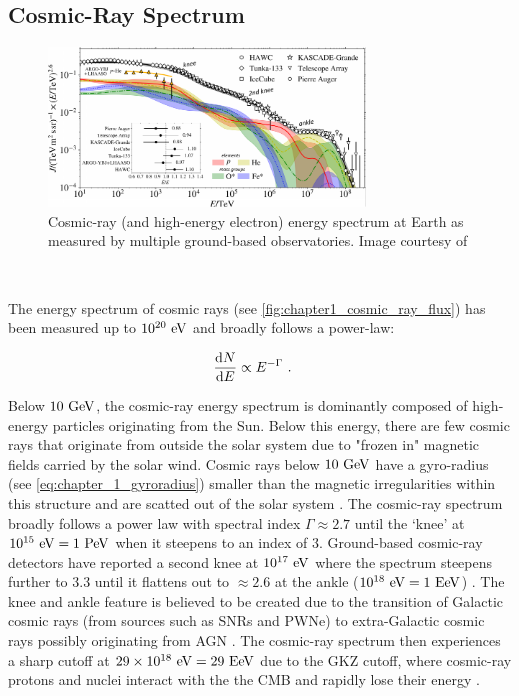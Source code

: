 \subsection{Cosmic-Ray Spectrum} \label{sec:chapter_1_cr_spectrum}
\begin{figure}
    \centering
    \includegraphics[width=0.75\textwidth]{04_Introduction/Images/cosmic_rays/cosmic_ray_spectrum.pdf}
    \caption{Cosmic-ray (and high-energy electron) energy spectrum at Earth as measured by multiple ground-based observatories. Image courtesy of \cite{2019BAAS...51c.131S}}
    \label{fig:chapter1_cosmic_ray_flux}
\end{figure}
\par~\par
The energy spectrum of cosmic rays (see \autoref{fig:chapter1_cosmic_ray_flux}) has been measured up to $10^{20}~\eV$ \citep{2022arXiv221116020T} and broadly follows a power-law:

\begin{equation}
    \begin{aligned}
    \dv{N}{E}&\propto E^{-\Gamma}\text{ .}
    \end{aligned}
\end{equation}

Below $10~\GeV$, the cosmic-ray energy spectrum is dominantly composed of high-energy particles originating from the Sun. Below this energy, there are few cosmic rays that originate from outside the solar system due to "frozen in" magnetic fields carried by the solar wind. Cosmic rays below $10~\GeV$ have a gyro-radius (see \autoref{eq:chapter_1_gyroradius}) smaller than the magnetic irregularities within this structure and are scatted out of the solar system \citep{2002cra..book.....S}. The cosmic-ray spectrum broadly follows a power law with spectral index $\Gamma\approx 2.7$ until the `knee' at $10^{15}~\eV=1~\PeV$ when it steepens to an index of $3$. Ground-based cosmic-ray detectors have reported a second knee at $10^{17}~\eV$ where the spectrum steepens further to $3.3$ until it flattens out to $\approx 2.6$ at the ankle ($10^{18}~\eV=1~\si{E\electronvolt}$) \citep{2008ApJ...678.1165A,2010PhLB..685..239A, 2013PhRvD..87h1101A, 2013PhRvD..88d2004A,2013ApJ...768L...1A}. The knee and ankle feature is believed to be created due to the transition of Galactic cosmic rays (from sources such as SNRs and PWNe) to extra-Galactic cosmic rays possibly originating from AGN \citep{2016A&A...595A..33T}. The cosmic-ray spectrum then experiences a sharp cutoff at $29\times10^{18}~\eV = 29~\si{E\electronvolt}$ due to the GKZ cutoff, where cosmic-ray protons and nuclei interact with the the CMB and rapidly lose their energy \citep{1966PhRvL..16..748G,1966JETPL...4...78Z}. 

